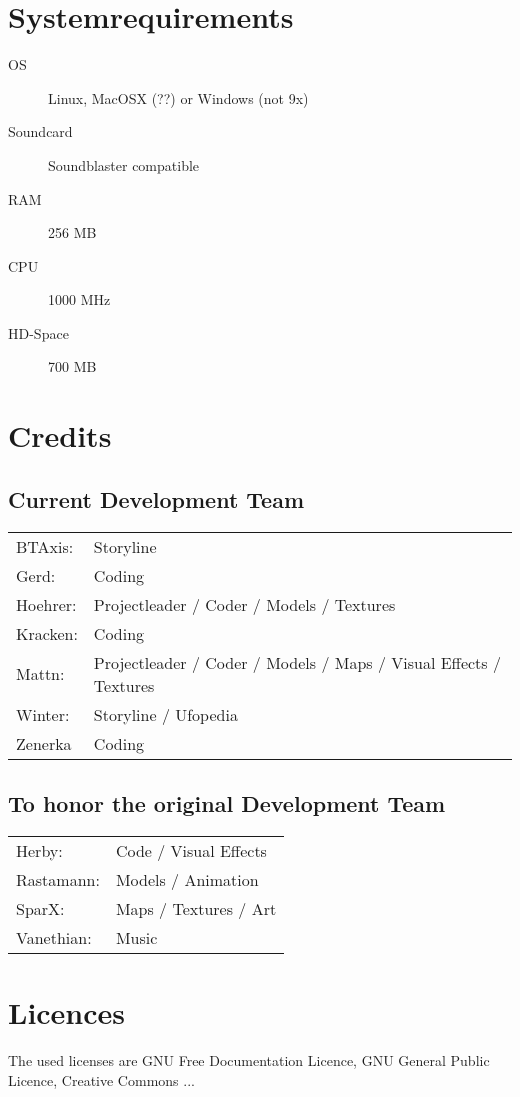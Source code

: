 \section{Systemrequirements}

\begin{description}
\item[OS] Linux, MacOSX (??) or Windows (not 9x)
\item[Soundcard] Soundblaster compatible
\item[RAM] 256 MB
\item[CPU] 1000 MHz
\item[HD-Space] 700 MB
\end{description}

\section{Credits}

\subsection{Current Development Team}
\begin{tabular}{ll}
BTAxis:  	&	Storyline \\
Gerd:		&	Coding \\
Hoehrer:  	&	Projectleader / Coder / Models / Textures \\
Kracken:	&	Coding \\
Mattn:  	&	Projectleader / Coder / Models / Maps / Visual Effects / Textures \\
Winter:		&	Storyline / Ufopedia \\
Zenerka		&	Coding
\end{tabular} 

\subsection{To honor the original Development Team}
\begin{tabular}{ll}
Herby:  	&	Code / Visual Effects\\ 
Rastamann:	&	Models / Animation\\ 
SparX:  	&	Maps / Textures / Art\\ 
Vanethian:  &	Music\\ 
\end{tabular} 

\newpage

\section{Licences}
The used licenses are GNU Free Documentation Licence, GNU General Public Licence, Creative Commons ...

